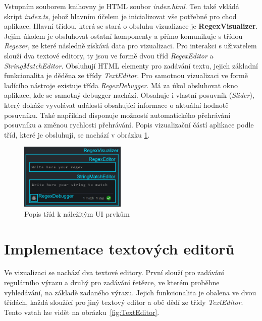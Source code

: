 Vstupním souborem knihovny je HTML soubor \textit{index.html}.
Ten také vkládá skript \textit{index.ts}, jehož hlavním účelem je inicializovat vše potřebné pro chod aplikace.
Hlavní třídou, která se stará o obsluhu vizualizace je \textbf{RegexVisualizer}. 
Jejím úkolem je obsluhovat ostatní komponenty a přímo komunikuje s třídou \textit{Regexer}, ze které následně získává data pro vizualizaci.
Pro interakci s uživatelem slouží dva textové editory, ty jsou ve formě dvou tříd \textit{RegexEditor} a \textit{StringMatchEditor}.
Obsluhují HTML elementy pro zadávání textu, jejich základní funkcionalita je děděna ze třídy \textit{TextEditor}.
Pro samotnou vizualizaci ve formě ladícího nástroje existuje třída \textit{RegexDebugger}.
Má za úkol obsluhovat okno aplikace, kde se samotný debugger nachází.
Obsahuje i vlastní posuvník (\textit{Slider}), který dokáže vyvolávat události obsahující informace o aktuální hodnotě posuvníku.
Také například disponuje možností automatického přehrávání posuvníku a změnou rychlosti přehrávání.
Popis vizualizační částí aplikace podle tříd, které je obsluhují, se nachází v obrázku \ref{fig:ClassesGeneralUI}.

\begin{figure}[!h]
	\centering
	\includegraphics[width=0.45\textwidth]{Figures/appWindowClassesDescription.png}
	\caption{Popis tříd k náležitým UI prvkům}
	\label{fig:ClassesGeneralUI}
\end{figure}

\section{Implementace textových editorů}

Ve vizualizaci se nachází dva textové editory.
První slouží pro zadávání regulárního výrazu a druhý pro zadávání řetězce, ve kterém proběhne vyhledávání, na základě zadaného výrazu.
Jejich funkcionalita je obalena ve dvou třídách, každá sloužící pro jiný textový editor a obě dědí ze třídy \textit{TextEditor}.
Tento vztah lze vidět na obrázku~\ref{fig:TextEditor}.

